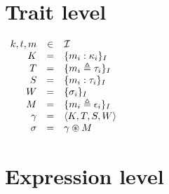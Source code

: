 \documentclass{article}[11pt]
\begin{document}
    \section{Trait level}\label{sec:trait-level}

    \begin{math}
        \begin{array}{rclp{5cm}}
            k, t, m & \in & {\cal I}                          \\
            K       & =   & \{ m_i : \kappa_i \}_I            \\
            T       & =   & \{ m_i \triangleq \tau_i \}_I     \\
            S       & =   & \{ m_i : \tau_i \}_I              \\
            W       & =   & \{ \sigma_i \}_I                  \\
            M       & =   & \{ m_i \triangleq \epsilon_i \}_I \\
            \gamma  & =   & \langle K, T, S, W \rangle        \\
            \sigma  & =   & \gamma \circledast M
        \end{array}
    \end{math}


    \section{Expression level}\label{sec:expression-level}
\end{document}
